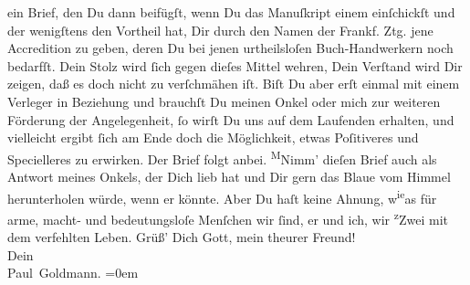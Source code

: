 \begin{ledgroupsized}[t]{13cm}
               ein Brief, den Du dann beifügſt, wenn Du das Manuſkript einem \label{K_L02709-9v}\label{K_L02709-9h} einſchickſt und der wenigſtens den Vortheil hat, Dir durch
               den Namen der Frankf. Ztg. jene Accredition zu
               geben, deren Du bei jenen urtheilsloſen Buch-Handwerkern noch bedarfſt. Dein Stolz
               wird ſich gegen dieſes Mittel wehren, Dein Verſtand wird Dir zeigen, daß es doch {\pb}nicht zu verſchmähen iſt. Biſt Du aber erſt einmal
               mit einem Verleger in Beziehung und brauchſt Du meinen Onkel oder mich zur weiteren Förderung der
               Angelegenheit, ſo wirſt Du uns auf dem Laufenden erhalten, und vielleicht ergibt ſich
               am Ende doch die Möglichkeit, etwas Poſitiveres und Specielleres zu erwirken.\pend
           \pstart
           Der Brief folgt anbei.\pend
           \pstart
           {\pb}\substVorne{}\textsuperscript{M}\substDazwischen{}N\substHinten{}imm' dieſen Brief auch als Antwort meines Onkels, der Dich lieb hat und Dir gern das Blaue vom Himmel
               herunterholen würde, wenn er könnte. Aber Du haſt keine Ahnung, w\substVorne{}\textsuperscript{ie}\substDazwischen{}a\substHinten{}s für arme, macht- und bedeutungsloſe Menſchen wir ſind, er und ich, wir \substVorne{}\textsuperscript{z}\substDazwischen{}Z\substHinten{}wei mit dem verfehlten Leben.\pend
           \pstart
           Grüß’ Dich Gott, mein theurer Freund! {\\[\baselineskip]}Dein {\\[\baselineskip]}\spacefill\mbox{Paul Goldmann.}\pend
           \leftskip=0em{}
         
         \endnumbering{}\end{ledgroupsized}  \newcommand{\dateiname}{L02709}\newcommand{\titel}{Paul Goldmann an Arthur Schnitzler, 3. 6. 1893}\newcommand{\editorInnen}{Martin Anton Müller und Laura Untner}
      